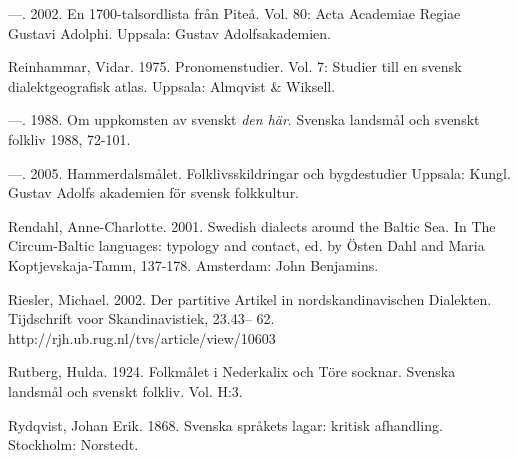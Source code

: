 \begin{styleBodytextC}
—. 2002. En 1700-talsordlista från Piteå. Vol. 80: Acta Academiae Regiae Gustavi Adolphi. Uppsala: Gustav Adolfsakademien.

\end{styleBodytextC}

\begin{styleBodytextC}
Reinhammar, Vidar. 1975. Pronomenstudier. Vol. 7: Studier till en svensk dialektgeografisk atlas. Uppsala: Almqvist \& Wiksell.

\end{styleBodytextC}

\begin{styleBodytextC}
—. 1988. Om uppkomsten av svenskt \textit{den här}. Svenska landsmål och svenskt folkliv 1988, 72-101.

\end{styleBodytextC}

\begin{styleBodytextC}
—. 2005. Hammerdalsmålet. Folklivsskildringar och bygdestudier Uppsala: Kungl. Gustav Adolfs akademien för svensk folkkultur.

\end{styleBodytextC}

\begin{styleBodytextC}
Rendahl, Anne-Charlotte. 2001. Swedish dialects around the Baltic Sea. In The Circum-Baltic languages: typology and contact, ed. by Östen Dahl and Maria Koptjevskaja-Tamm, 137-178. Amsterdam: John Benjamins.

\end{styleBodytextC}

\begin{styleBodytextC}
Riesler, Michael. 2002. Der partitive Artikel in nordskandinavischen Dialekten. Tijdschrift voor Skandinavistiek, 23.43– 62. http://rjh.ub.rug.nl/tvs/article/view/10603

\end{styleBodytextC}

\begin{styleBodytextC}
Rutberg, Hulda. 1924. Folkmålet i Nederkalix och Töre socknar. Svenska landsmål och svenskt folkliv. Vol. H:3.

\end{styleBodytextC}

\begin{styleBodytextC}
Rydqvist, Johan Erik. 1868. Svenska språkets lagar: kritisk afhandling. Stockholm: Norstedt.

\end{styleBodytextC}

